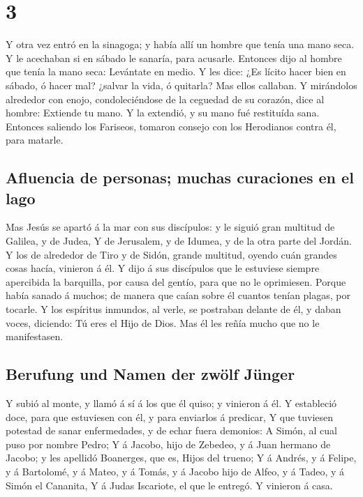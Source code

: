 \hypertarget{section-41-3}{%
\section{3}\label{section-41-3}}

 Y otra vez entró en la sinagoga; y había allí un hombre
que tenía una mano seca.  Y le acechaban si en sábado le
sanaría, para acusarle.  Entonces dijo al hombre que tenía
la mano seca: Levántate en medio.  Y les dice: ¿Es lícito
hacer bien en sábado, ó hacer mal? ¿salvar la vida, ó quitarla? Mas
ellos callaban.  Y mirándolos alrededor con enojo,
condoleciéndose de la ceguedad de su corazón, dice al hombre: Extiende
tu mano. Y la extendió, y su mano fué restituída sana. 
Entonces saliendo los Fariseos, tomaron consejo con los Herodianos
contra él, para matarle.

\hypertarget{afluencia-de-personas-muchas-curaciones-en-el-lago}{%
\subsection{Afluencia de personas; muchas curaciones en el
lago}\label{afluencia-de-personas-muchas-curaciones-en-el-lago}}

 Mas Jesús se apartó á la mar con sus discípulos: y le
siguió gran multitud de Galilea, y de Judea,  Y de
Jerusalem, y de Idumea, y de la otra parte del Jordán. Y los de
alrededor de Tiro y de Sidón, grande multitud, oyendo cuán grandes cosas
hacía, vinieron á él.  Y dijo á sus discípulos que le
estuviese siempre apercibida la barquilla, por causa del gentío, para
que no le oprimiesen.  Porque había sanado á muchos; de
manera que caían sobre él cuantos tenían plagas, por tocarle.
 Y los espíritus inmundos, al verle, se postraban delante
de él, y daban voces, diciendo: Tú eres el Hijo de Dios. 
Mas él les reñía mucho que no le manifestasen.

\hypertarget{berufung-und-namen-der-zwuxf6lf-juxfcnger}{%
\subsection{Berufung und Namen der zwölf
Jünger}\label{berufung-und-namen-der-zwuxf6lf-juxfcnger}}

 Y subió al monte, y llamó á sí á los que él quiso; y
vinieron á él.  Y estableció doce, para que estuviesen
con él, y para enviarlos á predicar,  Y que tuviesen
potestad de sanar enfermedades, y de echar fuera demonios:
 A Simón, al cual puso por nombre Pedro; 
Y á Jacobo, hijo de Zebedeo, y á Juan hermano de Jacobo; y les apellidó
Boanerges, que es, Hijos del trueno;  Y á Andrés, y á
Felipe, y á Bartolomé, y á Mateo, y á Tomás, y á Jacobo hijo de Alfeo, y
á Tadeo, y á Simón el Cananita,  Y á Judas Iscariote, el
que le entregó. Y vinieron á casa.

